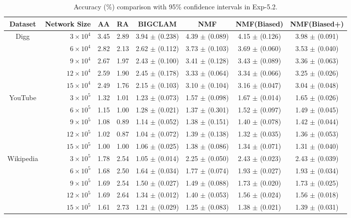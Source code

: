 \documentclass[10pt,journal,compsoc]{IEEEtran}
\newcommand{\NMF}{{\sf NMF}\xspace }
\newcommand{\Biased}{{\sf NMF(Biased)}\xspace}
\newcommand{\Aa}{{\sf AA}\xspace }
\newcommand{\RA}{{\sf RA}\xspace }
\newcommand{\BIGCLAM}{{\sf BIGCLAM}\xspace}
\newcommand{\Digg}{{\sf Digg}\xspace}
\newcommand{\YouTube}{{\sf YouTube}\xspace}
\newcommand{\Wikipedia}{{\sf Wikipedia}\xspace}
\newcommand{\Biasedp}{{\sf NMF(Biased+)}\xspace}
\begin{document}
\begin{table}
\caption{Accuracy (\%) comparison with 95\% confidence intervals in Exp-5.2.}
\label{tab_accuracy_8}
\vspace{-2ex}
\centering
\newcommand{\tabincell}[2]{\begin{tabular}{@{}#1@{}}#2\end{tabular}}
\begin{tabular}{c|r|c|c|c|c|c|c}
\hline \hline Dataset  & Network Size & \Aa & \RA & \BIGCLAM & \NMF & \Biased & \Biasedp  \\
\hline
\multirow{5}{*}{\Digg}
 & $3 \times 10^4 $  & 3.45 & 2.89 & 3.94 $\pm$ (0.238) & 4.39 $\pm$ (0.089) & 4.15 $\pm$ (0.126) & 3.98 $\pm$ (0.091) \\
 & $6 \times 10^4 $  & 2.82 & 2.13 & 2.62 $\pm$ (0.112) & 3.73 $\pm$ (0.103) & 3.69 $\pm$ (0.060) & 3.53 $\pm$ (0.040)  \\
 & $9 \times 10^4 $  & 2.67 & 1.97 & 2.43 $\pm$ (0.100) & 3.41 $\pm$ (0.128) & 3.43 $\pm$ (0.089) & 3.36 $\pm$ (0.063)  \\
 & $12 \times 10^4 $ & 2.59 & 1.90 & 2.45 $\pm$ (0.178) & 3.33 $\pm$ (0.064) & 3.34 $\pm$ (0.066) & 3.25 $\pm$ (0.026) \\
 & $15 \times 10^4 $ & 2.49 & 1.76 & 2.15 $\pm$ (0.103) & 3.10 $\pm$ (0.104) & 3.16 $\pm$ (0.047) & 3.04 $\pm$ (0.048)  \\
\hline
\multirow{5}{*}{\YouTube}
 & $3 \times 10^5 $  & 1.32 & 1.01 & 1.23 $\pm$ (0.073) & 1.57 $\pm$ (0.098) & 1.67 $\pm$ (0.014) & 1.65 $\pm$ (0.026)  \\
 & $6 \times 10^5 $  & 1.15 & 1.00 & 1.28 $\pm$ (0.021) & 1.37 $\pm$ (0.301) & 1.52 $\pm$ (0.097) & 1.49 $\pm$ (0.045)  \\
 & $9 \times 10^5 $  & 1.08 & 0.89 & 1.14 $\pm$ (0.052) & 1.38 $\pm$ (0.151) & 1.40 $\pm$ (0.078) & 1.42 $\pm$ (0.044)  \\
 & $12 \times 10^5 $ & 1.02 & 0.87 & 1.04 $\pm$ (0.072) & 1.39 $\pm$ (0.138) & 1.32 $\pm$ (0.035) & 1.36 $\pm$ (0.053)  \\
 & $15 \times 10^5 $ & 1.00 & 1.00 & 1.06 $\pm$ (0.025) & 1.38 $\pm$ (0.086) & 1.34 $\pm$ (0.071) & 1.31 $\pm$ (0.040)  \\
\hline
\multirow{5}{*}{\Wikipedia}
 & $3 \times 10^5 $  & 1.78 & 2.54 & 1.05 $\pm$ (0.014) & 2.25 $\pm$ (0.050) & 2.43 $\pm$ (0.023) & 2.43 $\pm$ (0.039)  \\
 & $6 \times 10^5 $  & 1.68 & 2.50 & 1.64 $\pm$ (0.034) & 1.77 $\pm$ (0.074) & 1.93 $\pm$ (0.027) & 1.93 $\pm$ (0.034)  \\
 & $9 \times 10^5 $  & 1.69 & 2.54 & 1.50 $\pm$ (0.027) & 1.49 $\pm$ (0.088) & 1.73 $\pm$ (0.020) & 1.73 $\pm$ (0.025)  \\
 & $12 \times 10^5 $ & 1.69 & 2.64 & 1.34 $\pm$ (0.012) & 1.40 $\pm$ (0.053) & 1.56 $\pm$ (0.024) & 1.56 $\pm$ (0.018)  \\
 & $15 \times 10^5 $ & 1.61 & 2.73 & 1.21 $\pm$ (0.029) & 1.25 $\pm$ (0.083) & 1.38 $\pm$ (0.021) & 1.39 $\pm$ (0.031) \\
\hline \hline
\end{tabular}
\vspace{-2ex}
\end{table}
\end{document}
